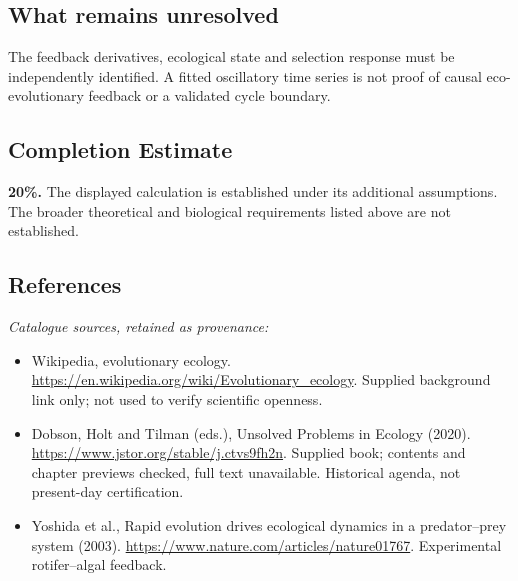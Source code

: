 \documentclass[11pt]{article}
\begin{document}
\subsection{What remains unresolved}
The feedback derivatives, ecological state and selection response must be independently identified. A fitted oscillatory time series is not proof of causal eco-evolutionary feedback or a validated cycle boundary.
\subsection{Completion Estimate}
\textbf{20\%.} The displayed calculation is established under its additional assumptions. The broader theoretical and biological requirements listed above are not established.
\subsection{References}
\noindent\emph{Catalogue sources, retained as provenance:}
\begin{itemize}
\item Wikipedia, evolutionary ecology. \url{https://en.wikipedia.org/wiki/Evolutionary_ecology}. Supplied background link only; not used to verify scientific openness.
\item Dobson, Holt and Tilman (eds.), Unsolved Problems in Ecology (2020). \url{https://www.jstor.org/stable/j.ctvs9fh2n}. Supplied book; contents and chapter previews checked, full text unavailable. Historical agenda, not present-day certification.
\item Yoshida et al., Rapid evolution drives ecological dynamics in a predator--prey system (2003). \url{https://www.nature.com/articles/nature01767}. Experimental rotifer--algal feedback.
\end{itemize}
\clearpage


\appendix
\end{document}
